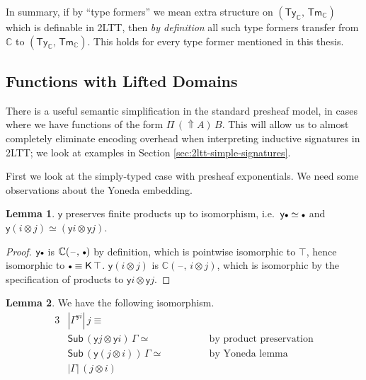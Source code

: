 \documentclass[12pt,a4paper,twoside,openany]{book}
\theoremstyle{remark}
\theoremstyle{definition}
\newtheorem{mylemma}{Lemma}
\newcommand{\ms}[1]{\mathsf{#1}}
\newcommand{\mbb}[1]{\mathbb{#1}}
\newcommand{\Sub}{\mathsf{Sub}}
\newcommand{\Tm}{\mathsf{Tm}}
\newcommand{\Ty}{\mathsf{Ty}}
\newcommand{\blank}{\mathord{\hspace{1pt}\text{--}\hspace{1pt}}}
\newcommand{\Lift}{\Uparrow}
\newcommand{\emptycon}{\scaleobj{.75}\bullet}
\newcommand{\K}{\mathsf{K}}
\newcommand{\mbbC}{\mbb{C}}
\newcommand{\yon}{\ms{y}}
\begin{document}
In summary, if by ``type formers'' we mean extra structure on
$(\Ty_{\mbbC},\,\Tm_{\mbbC})$ which is definable in 2LTT, then \emph{by
definition} all such type formers transfer from $\mbbC$ to
$(\Ty_{\mbbC},\,\Tm_{\mbbC})$. This holds for every type former mentioned in
this thesis.

\subsection{Functions with Lifted Domains}

There is a useful semantic simplification in the standard presheaf model, in
cases where we have functions of the form $\Pi\,(\Lift\!A)\,B$. This will allow
us to almost completely eliminate encoding overhead when interpreting inductive
signatures in 2LTT; we look at examples in Section
\ref{sec:2ltt-simple-signatures}.

First we look at the simply-typed case with presheaf exponentials. We need some
observations about the Yoneda embedding.

\begin{mylemma}
$\yon$ preserves finite products up to isomorphism, i.e.\ $\yon \emptycon \simeq
  \emptycon$ and $\yon (i \otimes j) \simeq (\yon i \otimes \yon j)$.
\end{mylemma}
\begin{proof}
$\yon \emptycon$ is $\mbbC(\blank,\,\emptycon)$ by definition, which is
pointwise isomorphic to $\top$, hence isomorphic to $\emptycon \equiv
\K\,\top$. $\yon (i \otimes j)$ is $\mbbC(\blank,\,i \otimes j)$, which is
isomorphic by the specification of products to $\yon i \otimes \yon j$.
\end{proof}

\begin{mylemma} We have the following isomorphism.
\begin{alignat*}{3}
  & |\Gamma^{\yon i}|\,j \equiv \hspace{3em}&&\\
  & \Sub\,(\yon j \otimes \yon i)\,\Gamma \simeq \hspace{3em} &&\text{by product preservation}\\
  & \Sub\,(\yon (j \otimes i))\,\Gamma \simeq \hspace{3em} &&\text {by Yoneda lemma}\\
  & |\Gamma|\,(j \otimes i)&&
\end{alignat*}
\end{mylemma}
\end{document}
